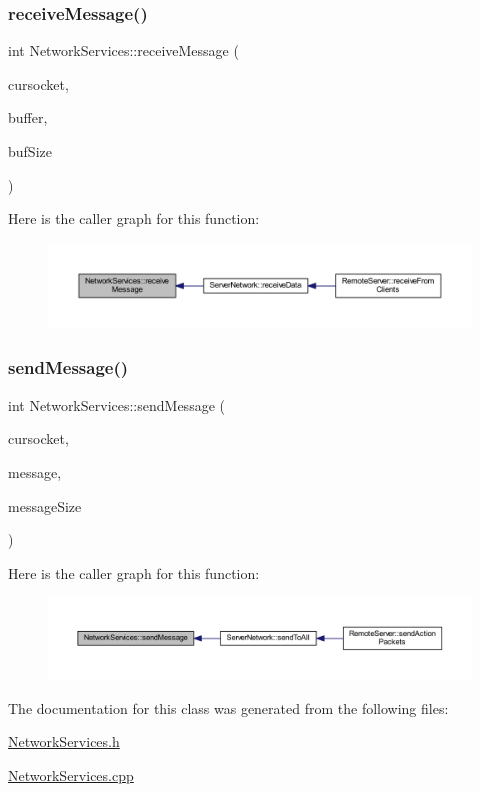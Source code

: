 \subsubsection{\texorpdfstring{receive\+Message()}{receiveMessage()}}
{\footnotesize\ttfamily int Network\+Services\+::receive\+Message (\begin{DoxyParamCaption}\item[{S\+O\+C\+K\+ET}]{cursocket,  }\item[{char $\ast$}]{buffer,  }\item[{int}]{buf\+Size }\end{DoxyParamCaption})\hspace{0.3cm}{\ttfamily [static]}}

Here is the caller graph for this function\+:
\nopagebreak
\begin{figure}[H]
\begin{center}
\leavevmode
\includegraphics[width=350pt]{class_network_services_a91eb95e2b42c6ec05f7cf6a6365045be_icgraph}
\end{center}
\end{figure}
\mbox{\label{class_network_services_aecc2718ec3bbea2b6a3b309a305295d7}} 
\subsubsection{\texorpdfstring{send\+Message()}{sendMessage()}}
{\footnotesize\ttfamily int Network\+Services\+::send\+Message (\begin{DoxyParamCaption}\item[{S\+O\+C\+K\+ET}]{cursocket,  }\item[{char $\ast$}]{message,  }\item[{int}]{message\+Size }\end{DoxyParamCaption})\hspace{0.3cm}{\ttfamily [static]}}

Here is the caller graph for this function\+:
\nopagebreak
\begin{figure}[H]
\begin{center}
\leavevmode
\includegraphics[width=350pt]{class_network_services_aecc2718ec3bbea2b6a3b309a305295d7_icgraph}
\end{center}
\end{figure}


The documentation for this class was generated from the following files\+:\begin{DoxyCompactItemize}
\item 
\mbox{\hyperlink{_network_services_8h}{Network\+Services.\+h}}\item 
\mbox{\hyperlink{_network_services_8cpp}{Network\+Services.\+cpp}}\end{DoxyCompactItemize}
